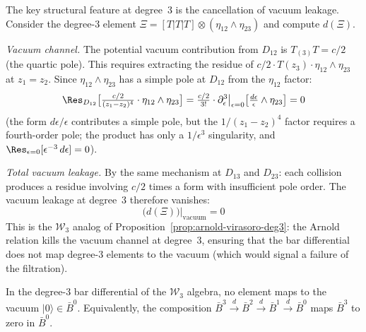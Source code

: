 \begin{computation}
\label{comp:w3-arnold-deg3}

The key structural feature at degree~3 is the cancellation of
vacuum leakage.  Consider the degree-3 element
$\Xi = [T|T|T] \otimes (\eta_{12} \wedge \eta_{23})$ and compute
$d(\Xi)$.

\emph{Vacuum channel.}
The potential vacuum contribution from $D_{12}$ is
$T_{(3)}T = c/2$ (the quartic pole).  This requires extracting the
residue of $c/2 \cdot T(z_3) \cdot \eta_{12} \wedge \eta_{23}$
at $z_1 = z_2$.  Since $\eta_{12} \wedge \eta_{23}$ has a
simple pole at $D_{12}$ from the $\eta_{12}$ factor:
\[
\Res_{D_{12}}\bigl[\tfrac{c/2}{(z_1-z_2)^4}
\cdot \eta_{12} \wedge \eta_{23}\bigr]
= \tfrac{c/2}{3!} \cdot
\partial_\epsilon^3\bigl|_{\epsilon=0}
\bigl[\tfrac{d\epsilon}{\epsilon} \wedge \eta_{23}\bigr] = 0
\]
(the form $d\epsilon/\epsilon$ contributes a simple pole, but the
$1/(z_1-z_2)^4$ factor requires a fourth-order pole; the product
has only a $1/\epsilon^3$ singularity, and
$\Res_{\epsilon=0}[\epsilon^{-3}\,d\epsilon] = 0$).

\emph{Total vacuum leakage.}
By the same mechanism at $D_{13}$ and $D_{23}$: each collision
produces a residue involving $c/2$ times a form with insufficient
pole order.  The vacuum leakage at degree~3 therefore vanishes:
\begin{equation}\label{eq:w3-deg3-no-vacuum}
\bigl(d(\Xi)\bigr)\big|_{\text{vacuum}} = 0
\end{equation}
This is the $\mathcal{W}_3$ analog of
Proposition~\ref{prop:arnold-virasoro-deg3}: the Arnold relation
kills the vacuum channel at degree~3, ensuring that the bar
differential does not map degree-3 elements to the vacuum
(which would signal a failure of the filtration).
\end{computation}

\begin{proposition}
\label{prop:w3-deg3-vacuum}
In the degree-$3$ bar differential of the $\mathcal{W}_3$ algebra,
no element maps to the vacuum $|0\rangle \in \bar{B}^0$.
Equivalently, the composition $\bar{B}^3 \xrightarrow{d}
\bar{B}^2 \xrightarrow{d} \bar{B}^1 \xrightarrow{d}
\bar{B}^0$ maps $\bar{B}^3$ to zero in $\bar{B}^0$.
\end{proposition}

